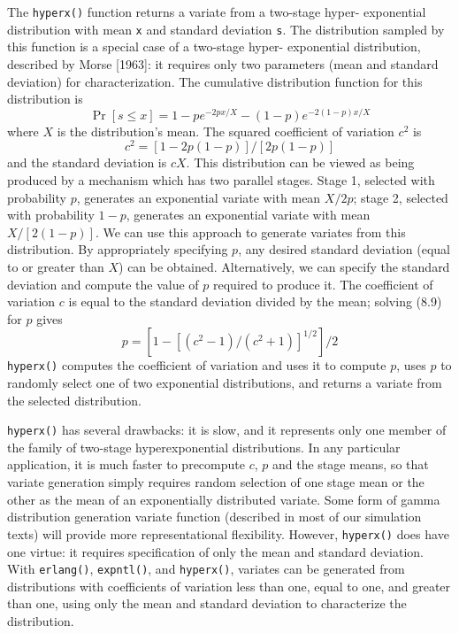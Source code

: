 The \texttt{hyperx()} function returns a variate from a two-stage hyper-
exponential distribution with mean \texttt{x} and standard deviation \texttt{s}. The distribution
sampled by this function is a special case of a two-stage hyper-
exponential distribution, described by Morse [1963]: it requires only two
parameters (mean and standard deviation) for characterization. The
cumulative distribution function for this distribution is
\begin{equation}
\Pr[s\le x]=1-pe^{-2px/X}-(1-p)e^{-2(1-p)x/X}
\end{equation}
where $X$ is the distribution's mean. The squared coefficient of variation $c^2$ is
\begin{equation}
c^2=[1-2p(1-p)]/[2p(1-p)]
\end{equation}
and the standard deviation is $cX$. This distribution can be viewed as being
produced by a mechanism which has two parallel stages. Stage 1, selected
with probability $p$, generates an exponential variate with mean $X/2p$; stage
2, selected with probability $1-p$, generates an exponential variate with
mean $X/[2(1-p)]$. We can use this approach to generate variates from this
distribution. By appropriately specifying $p$, any desired standard deviation
(equal to or greater than $X$) can be obtained. Alternatively, we can specify
the standard deviation and compute the value of $p$ required to produce it.
The coefficient of variation $c$ is equal to the standard deviation divided by
the mean; solving (8.9) for $p$ gives
\begin{equation}
p=[1-[(c^2-1)/(c^2+1)]^{1/2}]/2
\end{equation}
\texttt{hyperx()} computes the coefficient of variation and uses it to compute $p$, uses
$p$ to randomly select one of two exponential distributions, and returns a
variate from the selected distribution.

\texttt{hyperx()} has several drawbacks: it is slow, and it represents only one
member of the family of two-stage hyperexponential distributions. In any
particular application, it is much faster to precompute $c$, $p$ and the stage
means, so that variate generation simply requires random selection of one
stage mean or the other as the mean of an exponentially distributed variate.
Some form of gamma distribution generation variate function (described in
most of our simulation texts) will provide more representational flexibility.
However, \texttt{hyperx()} does have one virtue: it requires specification of only
the mean and standard deviation. With \texttt{erlang()}, \texttt{expntl()}, and
\texttt{hyperx()}, variates can be generated from distributions with coefficients of
variation less than one, equal to one, and greater than one, using only the
mean and standard deviation to characterize the distribution.

